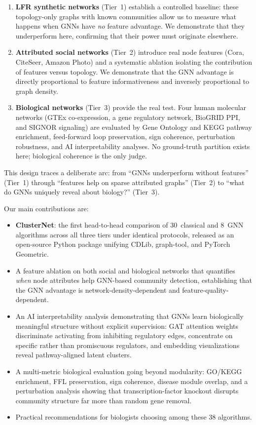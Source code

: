 \documentclass[11pt]{article}
\begin{document}
\begin{enumerate}[leftmargin=*]
  \item \textbf{LFR synthetic networks} (Tier~1) establish a controlled baseline: these topology-only graphs with known communities allow us to measure what happens when GNNs have \emph{no} feature advantage. We demonstrate that they underperform here, confirming that their power must originate elsewhere.

  \item \textbf{Attributed social networks} (Tier~2) introduce real node features (Cora, CiteSeer, Amazon Photo) and a systematic ablation isolating the contribution of features versus topology. We demonstrate that the GNN advantage is directly proportional to feature informativeness and inversely proportional to graph density.

  \item \textbf{Biological networks} (Tier~3) provide the real test. Four human molecular networks (GTEx co-expression, a gene regulatory network, BioGRID PPI, and SIGNOR signaling) are evaluated by Gene Ontology and KEGG pathway enrichment, feed-forward loop preservation, sign coherence, perturbation robustness, and AI interpretability analyses. No ground-truth partition exists here; biological coherence is the only judge.
\end{enumerate}

\noindent This design traces a deliberate arc: from ``GNNs underperform without features'' (Tier~1) through ``features help on sparse attributed graphs'' (Tier~2) to ``what do GNNs uniquely reveal about biology?'' (Tier~3).

Our main contributions are:
\begin{itemize}[leftmargin=*]
  \item \textbf{ClusterNet}: the first head-to-head comparison of 30~classical and 8~GNN algorithms across all three tiers under identical protocols, released as an open-source Python package unifying CDLib, graph-tool, and PyTorch Geometric.
  \item A feature ablation on both social and biological networks that quantifies \emph{when} node attributes help GNN-based community detection, establishing that the GNN advantage is network-density-dependent and feature-quality-dependent.
  \item An AI interpretability analysis demonstrating that GNNs learn biologically meaningful structure without explicit supervision: GAT attention weights discriminate activating from inhibiting regulatory edges, concentrate on specific rather than promiscuous regulators, and embedding visualizations reveal pathway-aligned latent clusters.
  \item A multi-metric biological evaluation going beyond modularity: GO/KEGG enrichment, FFL preservation, sign coherence, disease module overlap, and a perturbation analysis showing that transcription-factor knockout disrupts community structure far more than random gene removal.
  \item Practical recommendations for biologists choosing among these 38 algorithms.
\end{itemize}
\end{document}
